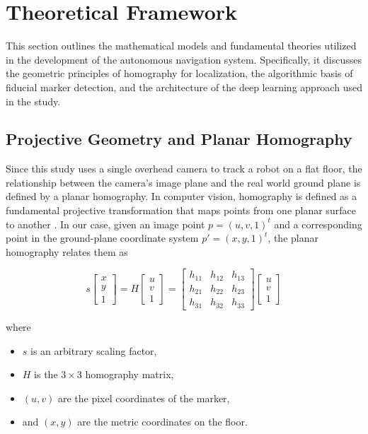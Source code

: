 \section{Theoretical Framework}
This section outlines the mathematical models and fundamental theories utilized in the development of the autonomous navigation system. Specifically, it discusses the geometric principles of homography for localization, the algorithmic basis of fiducial marker detection, and the architecture of the deep learning approach used in the study.
\subsection{Projective Geometry and Planar Homography}
Since this study uses a single overhead camera to track a robot on a flat floor, the relationship between the camera’s image plane and the real world ground plane is defined by a planar homography. In computer vision, homography is defined as a fundamental projective transformation that maps points from one planar surface to another \cite{Hartley2003MultipleViewGeometry}. In our case, given an image point $p = (u, v, 1)^{t}$ and a corresponding point in the ground-plane coordinate system $p' = (x, y, 1)^{t}$, the planar homography relates them as 

\[
s
\begin{bmatrix}
x \\[2pt]
y \\[2pt]
1
\end{bmatrix}
=
H
\begin{bmatrix}
u \\[2pt]
v \\[2pt]
1
\end{bmatrix}
=
\begin{bmatrix}
h_{11} & h_{12} & h_{13} \\
h_{21} & h_{22} & h_{23} \\
h_{31} & h_{32} & h_{33}
\end{bmatrix}
\begin{bmatrix}
u \\[2pt]
v \\[2pt]
1
\end{bmatrix}
\]

where 
\begin{itemize}
    \item $s$ is an arbitrary scaling factor,
    \item $H$ is the $3\times3$ homography matrix,
    \item $(u,v)$ are the pixel coordinates of the marker,
    \item and $(x,y)$ are the metric coordinates on the floor.
\end{itemize}



